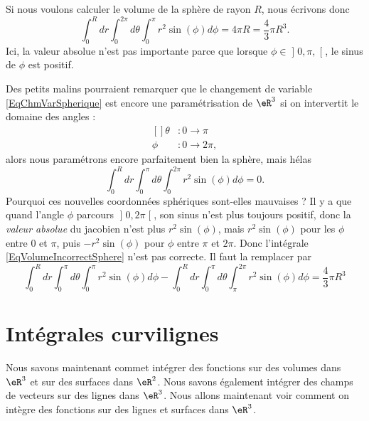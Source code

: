 Si nous voulons calculer le volume de la sphère de rayon $R$, nous écrivons donc
\begin{equation}
	\int_0^Rdr\int_{0}^{2\pi}d\theta\int_0^{\pi}r^2 \sin(\phi)d\phi=4\pi R=\frac{ 4 }{ 3 }\pi R^3.
\end{equation}
Ici, la valeur absolue n'est pas importante parce que lorsque $\phi\in\mathopen] 0,\pi ,  \mathclose[$, le sinus de $\phi$ est positif.

Des petits malins pourraient remarquer que le changement de variable \eqref{EqChmVarSpherique} est encore une paramétrisation de $\eR^3$ si on intervertit le domaine des angles : 
\begin{equation}
	\begin{aligned}[]
		\theta&\colon 0 \to \pi\\
		\phi	&\colon 0\to 2\pi,
	\end{aligned}
\end{equation}
alors nous paramétrons encore parfaitement bien la sphère, mais hélas
\begin{equation}		\label{EqVolumeIncorrectSphere}
	\int_0^Rdr\int_{0}^{\pi}d\theta\int_0^{2\pi}r^2 \sin(\phi)d\phi=0.
\end{equation}
Pourquoi ces \og nouvelles\fg{}  coordonnées sphériques sont-elles mauvaises ? Il y a que quand l'angle $\phi$ parcours $\mathopen] 0 , 2\pi \mathclose[$, son sinus n'est plus toujours positif, donc la \emph{valeur absolue} du jacobien n'est plus $r^2\sin(\phi)$, mais $r^2\sin(\phi)$ pour les $\phi$ entre $0$ et $\pi$, puis $-r^2\sin(\phi)$ pour $\phi$ entre $\pi$ et $2\pi$. Donc l'intégrale \eqref{EqVolumeIncorrectSphere} n'est pas correcte. Il faut la remplacer par
\begin{equation}
	\int_0^Rdr\int_{0}^{\pi}d\theta\int_0^{\pi}r^2 \sin(\phi)d\phi- \int_0^Rdr\int_{0}^{\pi}d\theta\int_{\pi}^{2\pi}r^2 \sin(\phi)d\phi = \frac{ 4 }{ 3 }\pi R^3
\end{equation}


\section{Intégrales curvilignes}

Nous savons maintenant commet intégrer des fonctions sur des volumes dans $\eR^3$ et sur des surfaces dans $\eR^2$. Nous savons également intégrer des champs de vecteurs sur des lignes dans $\eR^3$. Nous allons maintenant voir comment on intègre des fonctions sur des lignes et surfaces dans $\eR^3$.

